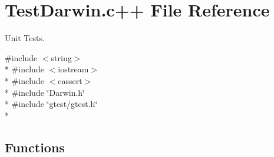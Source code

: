 \hypertarget{TestDarwin_8c_09_09}{\section{Test\-Darwin.\-c++ File Reference}
\label{TestDarwin_8c_09_09}
}


Unit Tests.  


{\ttfamily \#include $<$string$>$}\\*
{\ttfamily \#include $<$iostream$>$}\\*
{\ttfamily \#include $<$cassert$>$}\\*
{\ttfamily \#include \char`\"{}Darwin.\-h\char`\"{}}\\*
{\ttfamily \#include \char`\"{}gtest/gtest.\-h\char`\"{}}\\*
\subsection*{Functions}
